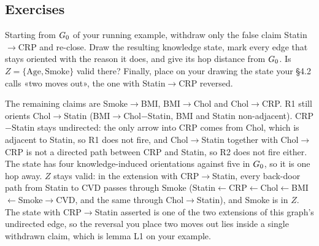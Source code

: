\subsection*{Exercises}

\begin{exercicio}[metodo=drawing,conceito=retracao]
Starting from $G_0$ of your running example, withdraw only the false claim Statin$\to$CRP and re-close.
Draw the resulting knowledge state, mark every edge that stays oriented with the reason it does, and give
its hop distance from $G_0$. Is $Z = \{\text{Age}, \text{Smoke}\}$ valid there? Finally, place on your
drawing the state your \S4.2 calls «two moves out», the one with Statin$\to$CRP reversed.
\end{exercicio}
\begin{solucao}
The remaining claims are Smoke$\to$BMI, BMI$\to$Chol and Chol$\to$CRP. R1 still orients Chol$\to$Statin
(BMI$\to$Chol$-$Statin, BMI and Statin non-adjacent). CRP$-$Statin stays undirected: the only arrow into
CRP comes from Chol, which is adjacent to Statin, so R1 does not fire, and Chol$\to$Statin together with
Chol$\to$CRP is not a directed path between CRP and Statin, so R2 does not fire either. The state has four
knowledge-induced orientations against five in $G_0$, so it is one hop away. $Z$ stays valid: in the
extension with CRP$\to$Statin, every back-door path from Statin to CVD passes through Smoke
(Statin$\leftarrow$CRP$\leftarrow$Chol$\leftarrow$BMI$\leftarrow$Smoke$\to$CVD, and the same through
Chol$\to$Statin), and Smoke is in $Z$. The state with CRP$\to$Statin asserted is one of the two extensions
of this graph's undirected edge, so the reversal you place two moves out lies inside a single withdrawn
claim, which is lemma L1 on your example.
\end{solucao}

